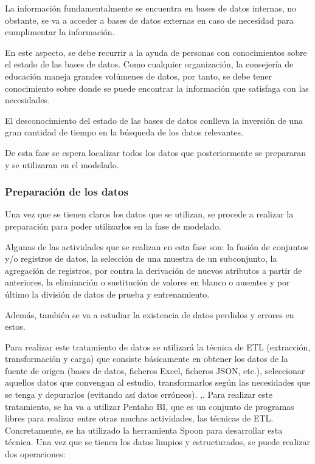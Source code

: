 
La información fundamentalmente se encuentra en bases de datos internas, no obstante, se va a acceder a bases de datos externas en caso de necesidad para cumplimentar la información. 

En este aspecto, se debe recurrir a la ayuda de personas con conocimientos sobre el estado de las bases de datos. Como cualquier organización, la consejería de educación maneja grandes volúmenes de datos, por tanto, se debe tener conocimiento sobre donde se puede encontrar la información que satisfaga con las necesidades. 

El desconocimiento del estado de las bases de datos conlleva la inversión de una gran cantidad de tiempo en la búsqueda de los datos relevantes. 

De esta fase se espera localizar todos los datos que posteriormente se prepararan y se utilizaran en el modelado.

\subsubsection{Preparación de los datos}
Una vez que se tienen claros los datos que se utilizan, se procede a realizar la preparación para poder utilizarlos en la fase de modelado.

Algunas de las actividades que se realizan en esta fase son: la fusión de conjuntos y/o registros de datos, la selección de una muestra de un subconjunto, la agregación de registros, por contra la derivación de nuevos atributos a partir de anteriores, la eliminación o sustitución de valores en blanco o ausentes y por último la división de datos de prueba y entrenamiento.

Además, también se va a estudiar la existencia de datos perdidos y errores en estos.

Para realizar este tratamiento de datos se utilizará la técnica de ETL (extracción, transformación y carga) que consiste básicamente en obtener los datos de la fuente de origen (bases de datos, ficheros Excel, ficheros JSON, etc.), seleccionar aquellos datos que convengan al estudio, transformarlos según las necesidades que se tenga y depurarlos (evitando así datos erróneos). \cite{prakash2017etl} \cite{matos2006metodologia},\cite{gour2010improve}.
Para realizar este tratamiento, se ha va a utilizar Pentaho BI, que es un conjunto de programas libres para realizar entre otras muchas actividades, las técnicas de ETL. Concretamente, se ha utilizado la herramienta Spoon para desarrollar esta técnica. 
Una vez que se tienen los datos limpios y estructurados, se puede realizar dos operaciones:

